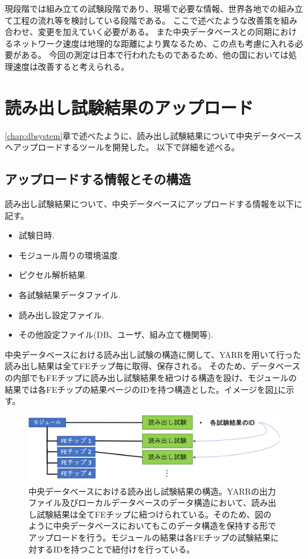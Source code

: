 現段階では組み立ての試験段階であり、現場で必要な情報、世界各地での組み立て工程の流れ等を検討している段階である。
ここで述べたような改善策を組み合わせ、変更を加えていく必要がある。
また中央データベースとの同期におけるネットワーク速度は地理的な距離により異なるため、この点も考慮に入れる必要がある。
今回の測定は日本で行われたものであるため、他の国においては処理速度は改善すると考えられる。


\clearpage
\section{読み出し試験結果のアップロード}
\ref{chap:dbsystem}章で述べたように、読み出し試験結果について中央データベースへアップロードするツールを開発した。
以下で詳細を述べる。
\subsection{アップロードする情報とその構造}
読み出し試験結果について、中央データベースにアップロードする情報を以下に記す。
\begin{itemize}
  \item 試験日時.
  \item モジュール周りの環境温度.
  \item ピクセル解析結果.
  \item 各試験結果データファイル.
  \item 読み出し設定ファイル.
  \item その他設定ファイル(DB、ユーザ、組み立て機関等).
\end{itemize}

中央データベースにおける読み出し試験の構造に関して、YARRを用いて行った読み出し結果は全てFEチップ毎に取得、保存される。
そのため、データベースの内部でもFEチップに読み出し試験結果を紐つける構造を設け、モジュールの結果では各FEチップの結果ページのIDを持つ構造とした。イメージを図\ref{structure_for_electrical_tests}に示す。

\begin{figure}[bpt]\centering
  \begin{center}
  \includegraphics[width=13cm]{./structure_for_electrical_tests.png}
  \caption[中央データベースにおける読み出し試験結果の構造]{中央データベースにおける読み出し試験結果の構造。YARRの出力ファイル及びローカルデータベースのデータ構造において、読み出し試験結果は全てFEチップに紐つけられている。そのため、図のように中央データベースにおいてもこのデータ構造を保持する形でアップロードを行う。モジュールの結果は各FEチップの試験結果に対するIDを持つことで紐付けを行っている。}
  \label{structure_for_electrical_tests}
  \end{center}
\end{figure}

